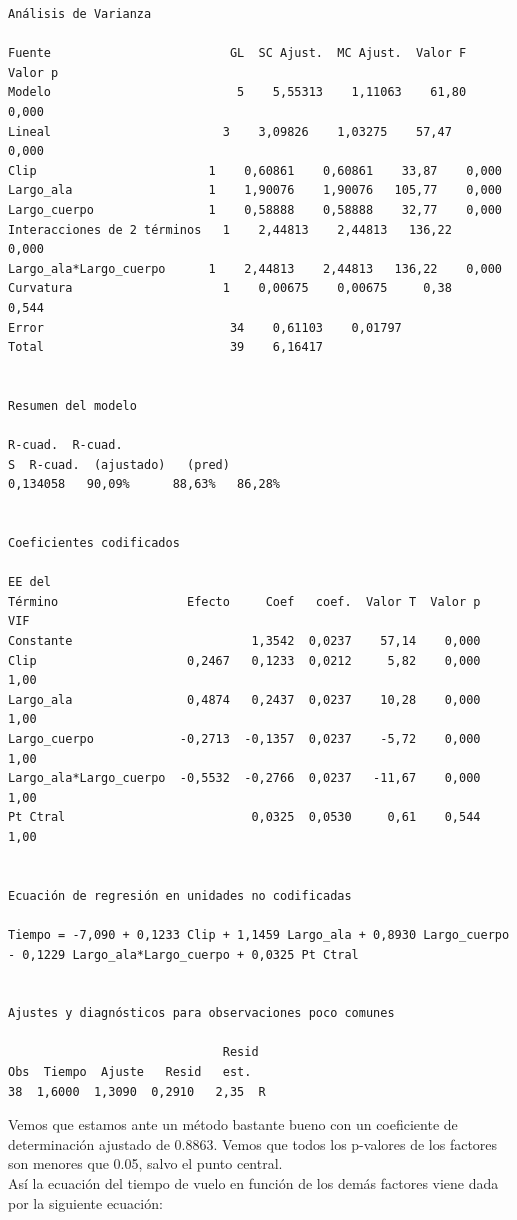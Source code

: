 \documentclass[12pt,a4paper,twoside,openright,titlepage,final]{article}
\begin{document}
\begin{verbatim}
Análisis de Varianza

Fuente                         GL  SC Ajust.  MC Ajust.  Valor F  Valor p
Modelo                          5    5,55313    1,11063    61,80    0,000
Lineal                        3    3,09826    1,03275    57,47    0,000
Clip                        1    0,60861    0,60861    33,87    0,000
Largo_ala                   1    1,90076    1,90076   105,77    0,000
Largo_cuerpo                1    0,58888    0,58888    32,77    0,000
Interacciones de 2 términos   1    2,44813    2,44813   136,22    0,000
Largo_ala*Largo_cuerpo      1    2,44813    2,44813   136,22    0,000
Curvatura                     1    0,00675    0,00675     0,38    0,544
Error                          34    0,61103    0,01797
Total                          39    6,16417


Resumen del modelo

R-cuad.  R-cuad.
S  R-cuad.  (ajustado)   (pred)
0,134058   90,09%      88,63%   86,28%


Coeficientes codificados

EE del
Término                  Efecto     Coef   coef.  Valor T  Valor p   VIF
Constante                         1,3542  0,0237    57,14    0,000
Clip                     0,2467   0,1233  0,0212     5,82    0,000  1,00
Largo_ala                0,4874   0,2437  0,0237    10,28    0,000  1,00
Largo_cuerpo            -0,2713  -0,1357  0,0237    -5,72    0,000  1,00
Largo_ala*Largo_cuerpo  -0,5532  -0,2766  0,0237   -11,67    0,000  1,00
Pt Ctral                          0,0325  0,0530     0,61    0,544  1,00


Ecuación de regresión en unidades no codificadas

Tiempo = -7,090 + 0,1233 Clip + 1,1459 Largo_ala + 0,8930 Largo_cuerpo
- 0,1229 Largo_ala*Largo_cuerpo + 0,0325 Pt Ctral


Ajustes y diagnósticos para observaciones poco comunes

                              Resid
Obs  Tiempo  Ajuste   Resid   est.
38  1,6000  1,3090  0,2910   2,35  R
\end{verbatim}

Vemos que estamos ante un método bastante bueno con un coeficiente de determinación ajustado de 0.8863. Vemos que todos los p-valores de los factores son menores que 0.05, salvo el punto central.\\

Así la ecuación del tiempo de vuelo en función de los demás factores viene dada por la siguiente ecuación:
\end{document}
